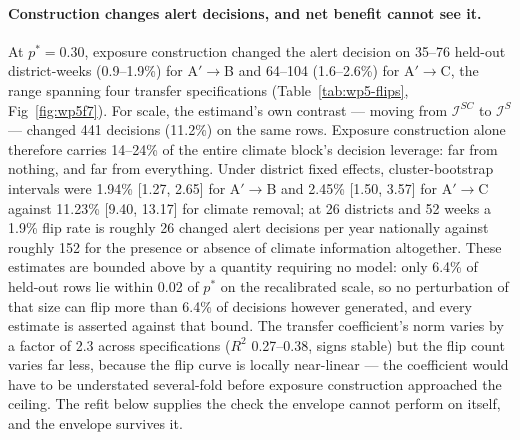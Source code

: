 \documentclass[11pt,a4paper]{article}
\begin{document}
\paragraph{Construction changes alert decisions, and net benefit cannot see it.} At $p^*=0.30$, exposure construction changed the alert decision on 35--76 held-out district-weeks (0.9--1.9\%) for A$'\to$B and 64--104 (1.6--2.6\%) for A$'\to$C, the range spanning four transfer specifications (Table~\ref{tab:wp5-flips}, Fig~\ref{fig:wp5f7}). For scale, the estimand's own contrast --- moving from $\mathcal I^{SC}$ to $\mathcal I^{S}$ --- changed 441 decisions (11.2\%) on the same rows. Exposure construction alone therefore carries 14--24\% of the entire climate block's decision leverage: far from nothing, and far from everything. Under district fixed effects, cluster-bootstrap intervals were 1.94\% [1.27, 2.65] for A$'\to$B and 2.45\% [1.50, 3.57] for A$'\to$C against 11.23\% [9.40, 13.17] for climate removal; at 26 districts and 52 weeks a 1.9\% flip rate is roughly 26 changed alert decisions per year nationally against roughly 152 for the presence or absence of climate information altogether. These estimates are bounded above by a quantity requiring no model: only 6.4\% of held-out rows lie within 0.02 of $p^*$ on the recalibrated scale, so no perturbation of that size can flip more than 6.4\% of decisions however generated, and every estimate is asserted against that bound. The transfer coefficient's norm varies by a factor of 2.3 across specifications ($R^2$ 0.27--0.38, signs stable) but the flip count varies far less, because the flip curve is locally near-linear --- the coefficient would have to be understated several-fold before exposure construction approached the ceiling. The refit below supplies the check the envelope cannot perform on itself, and the envelope survives it.
\end{document}
